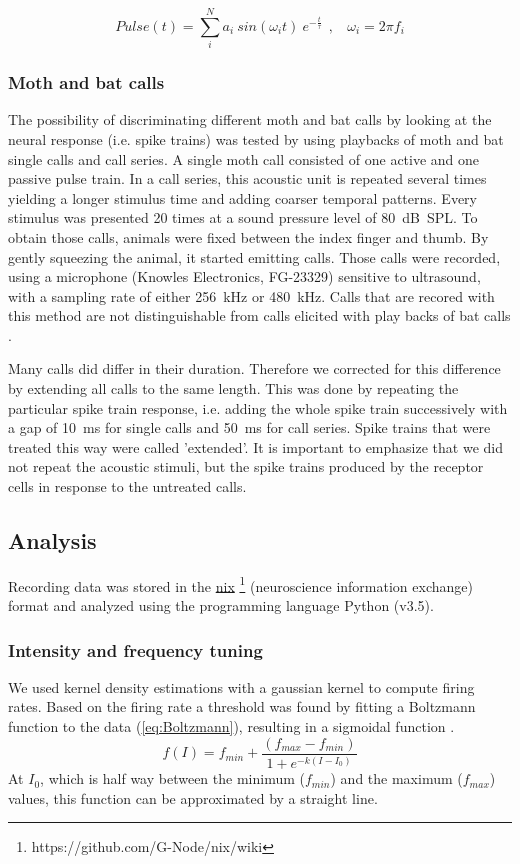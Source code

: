 \documentclass[12pt,a4paper,pdftex]{article}
\begin{document}
\begin{equation}
\label{eq:DampedSine}
Pulse(t) = \sum_{i}^{N} a_i~ sin(\omega_i t) ~e^{-\frac{t}{\tau}}~~,~~~~ \omega_i = 2 \pi f_i  
\end{equation}

\subsubsection*{Moth and bat calls}
The possibility of discriminating different moth and bat calls by looking at the neural response (i.e. spike trains) was tested by using playbacks of moth and bat single calls and call series. A single moth call consisted of one active and one passive pulse train. In a call series, this acoustic unit is repeated several times yielding a longer stimulus time and adding coarser temporal patterns. Every stimulus was presented 20 times at a sound pressure level of 80~dB~SPL. To obtain those calls, animals were fixed between the index finger and thumb. By gently squeezing the animal, it started emitting calls. Those calls were recorded, using a microphone (Knowles Electronics, FG-23329) sensitive to ultrasound, with a sampling rate of either 256~kHz or 480~kHz. Calls that are recored with this method are not distinguishable from calls elicited with play backs of bat calls \cite{barber2006, corcoran2010}.

Many calls did differ in their duration. Therefore we corrected for this difference by extending all calls to the same length. This was done by repeating the particular spike train response, i.e. adding the whole spike train successively with a gap of 10~ms for single calls and 50~ms for call series. Spike trains that were treated this way were called 'extended'. It is important to emphasize that we did not repeat the acoustic stimuli, but the spike trains produced by the receptor cells in response to the untreated calls.


\subsection*{Analysis}
Recording data was stored in the \href{https://github.com/G-Node/nix/wiki}{nix} \footnote{https://github.com/G-Node/nix/wiki} (neuroscience information exchange) format and analyzed using the programming language Python (v3.5).
 
\subsubsection*{Intensity and frequency tuning}
We used kernel density estimations with a gaussian kernel to compute firing rates. Based on the firing rate a threshold was found by fitting a Boltzmann function to the data (\ref{eq:Boltzmann}), resulting in a sigmoidal function \cite{benda2008}.
\begin{equation}
\label{eq:Boltzmann}
f(I) = f_{min} + \frac{(f_{max}-f_{min})}{1+e^{-k(I-I_0)}}
\end{equation}
At $I_{0}$, which is half way between the minimum ($f_{min}$) and the maximum ($f_{max}$) values, this function can be approximated by a straight line.
\end{document}
